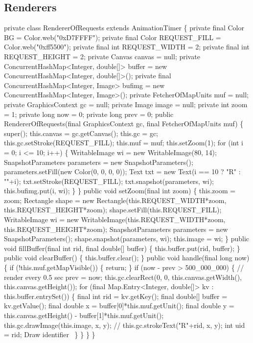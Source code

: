 \subsection{Renderers}
\nwenddocs{}\plusendmoddef
private class RendererOfRequests extends AnimationTimer \{
  private final Color BG = Color.web("0xD7FFFF");
  private final Color REQUEST_FILL = Color.web("0xff5500");
  private final int REQUEST_WIDTH = 2;
  private final int REQUEST_HEIGHT = 2;
  private Canvas canvas = null;
  private ConcurrentHashMap<Integer, double[]> buffer =
      new ConcurrentHashMap<Integer, double[]>();
  private final ConcurrentHashMap<Integer, Image> bufimg =
      new ConcurrentHashMap<Integer, Image>();
  private FetcherOfMapUnits muf = null;
  private GraphicsContext gc = null;
  private Image image = null;
  private int zoom = 1;
  private long now = 0;
  private long prev = 0;
  public RendererOfRequests(final GraphicsContext gc, final FetcherOfMapUnits muf) \{
    super();
    this.canvas = gc.getCanvas();
    this.gc = gc;
    this.gc.setStroke(REQUEST_FILL);
    this.muf = muf;
    this.setZoom(1);
    for (int i = 0; i <= 10; i++) \{
      WritableImage wi = new WritableImage(80, 14);
      SnapshotParameters parameters = new SnapshotParameters();
      parameters.setFill(new Color(0, 0, 0, 0));
      Text txt = new Text(i == 10 ? "R" : ""+i);
      txt.setStroke(REQUEST_FILL);
      txt.snapshot(parameters, wi);
      this.bufimg.put(i, wi);
    \}
  \}
  public void setZoom(final int zoom) \{
    this.zoom = zoom;
    Rectangle shape = new Rectangle(this.REQUEST_WIDTH*zoom, this.REQUEST_HEIGHT*zoom);
    shape.setFill(this.REQUEST_FILL);
    WritableImage wi = new WritableImage(this.REQUEST_WIDTH*zoom, this.REQUEST_HEIGHT*zoom);
    SnapshotParameters parameters = new SnapshotParameters();
    shape.snapshot(parameters, wi);
    this.image = wi;
  \}
  public void fillBuffer(final int rid, final double[] buffer) \{
    this.buffer.put(rid, buffer);
  \}
  public void clearBuffer() \{
    this.buffer.clear();
  \}
  public void handle(final long now) \{
    if (!this.muf.getMapVisible()) \{
      return;
    \}
    if (now - prev > 500_000_000) \{  // render every 0.5 sec
      prev = now;
      this.gc.clearRect(0, 0, this.canvas.getWidth(), this.canvas.getHeight());
      for (final Map.Entry<Integer, double[]> kv : this.buffer.entrySet()) \{
        final int rid = kv.getKey();
        final double[] buffer = kv.getValue();
        final double x = buffer[0]*this.muf.getUnit();
        final double y = this.canvas.getHeight() - buffer[1]*this.muf.getUnit();
        this.gc.drawImage(this.image, x, y);
        // this.gc.strokeText("R"+rid, x, y);
        int uid = rid;
        \LA{}Draw identifier~{\nwtagstyle{}}\RA{}
      \}
    \}
  \}
\}
\nwendcode{}\nwdocspar

